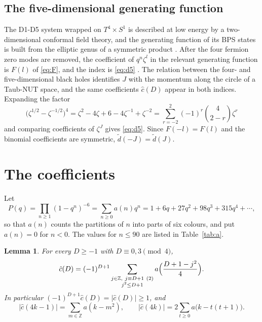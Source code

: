 \documentclass[11pt]{amsart}
\newtheorem{lemma}[theorem]{Lemma}
\theoremstyle{definition}
\newcommand{\ZZ}{\mathbb{Z}}
\newcommand{\cc}{\hat c}
\newcommand{\dt}{\tilde d}
\newcommand{\Kzero}{90}
\begin{document}
\subsection{The five-dimensional generating function}
The D1-D5 system wrapped on $T^4\times S^1$ is described at low energy by a two-dimensional conformal field theory, and the generating function of its BPS states is built from the elliptic genus of a symmetric product \cite{DMVV97,MMS99}. After the four fermion zero modes are removed, the coefficient of $q^n\zeta^l$ in the relevant generating function is $F(l)$ of \eqref{eq:F}, and the index is \eqref{eq:d5} \cite[(5.37)]{DGMS11}. The relation between the four- and five-dimensional black holes \cite{GSY06} identifies $J$ with the momentum along the circle of a Taub-NUT space, and the same coefficients $\cc(D)$ appear in both indices. Expanding the factor
\[
\bigl(\zeta^{1/2}-\zeta^{-1/2}\bigr)^4=\zeta^{2}-4\zeta+6-4\zeta^{-1}+\zeta^{-2}=\sum_{r=-2}^2(-1)^r\binom4{2-r}\zeta^{r}
\]
and comparing coefficients of $\zeta^J$ gives \eqref{eq:d5}. Since $F(-l)=F(l)$ and the binomial coefficients are symmetric, $\dt(-J)=\dt(J)$.

\section{The coefficients}\label{sec:c}

Let
\[
P(q)=\prod_{n\ge1}(1-q^n)^{-6}=\sum_{n\ge0}a(n)q^n=1+6q+27q^2+98q^3+315q^4+\cdots,
\]
so that $a(n)$ counts the partitions of $n$ into parts of six colours, and put $a(n)=0$ for $n<0$. The values for $n\le\Kzero$ are listed in Table~\ref{tab:a}.

\begin{lemma}\label{lem:theta}
For every $D\ge-1$ with $D\equiv0,3\pmod4$,
\begin{equation}\label{eq:theta}
\cc(D)=(-1)^{D+1}\sum_{\substack{j\in\ZZ,\ j\equiv D+1\ (2)\\ j^2\le D+1}}a\Bigl(\frac{D+1-j^2}{4}\Bigr).
\end{equation}
In particular $(-1)^{D+1}\cc(D)=|\cc(D)|\ge1$, and
\[
|\cc(4k-1)|=\sum_{m\in\ZZ}a(k-m^2),\qquad |\cc(4k)|=2\sum_{t\ge0}a\bigl(k-t(t+1)\bigr).
\]
\end{lemma}
\end{document}
